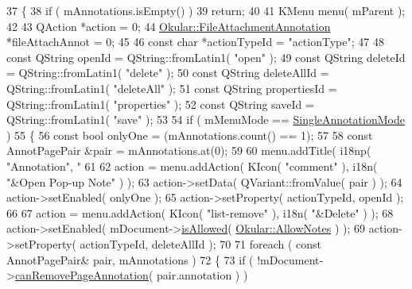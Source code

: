 \begin{DoxyCode}
37 \{
38     \textcolor{keywordflow}{if} ( mAnnotations.isEmpty() )
39         \textcolor{keywordflow}{return};
40 
41     KMenu menu( mParent );
42 
43     QAction *action = 0;
44     \hyperlink{classOkular_1_1FileAttachmentAnnotation}{Okular::FileAttachmentAnnotation} *fileAttachAnnot = 0;
45 
46     \textcolor{keyword}{const} \textcolor{keywordtype}{char} *actionTypeId = \textcolor{stringliteral}{"actionType"};
47 
48     \textcolor{keyword}{const} QString openId = QString::fromLatin1( \textcolor{stringliteral}{"open"} );
49     \textcolor{keyword}{const} QString deleteId = QString::fromLatin1( \textcolor{stringliteral}{"delete"} );
50     \textcolor{keyword}{const} QString deleteAllId = QString::fromLatin1( \textcolor{stringliteral}{"deleteAll"} );
51     \textcolor{keyword}{const} QString propertiesId = QString::fromLatin1( \textcolor{stringliteral}{"properties"} );
52     \textcolor{keyword}{const} QString saveId = QString::fromLatin1( \textcolor{stringliteral}{"save"} );
53 
54     \textcolor{keywordflow}{if} ( mMenuMode == \hyperlink{classAnnotationPopup_af8654f3f9c2a3377f86daf329f1e0679a40137692e843ce4f994737bd4a6f68f1}{SingleAnnotationMode} )
55     \{
56         \textcolor{keyword}{const} \textcolor{keywordtype}{bool} onlyOne = (mAnnotations.count() == 1);
57 
58         \textcolor{keyword}{const} AnnotPagePair &pair = mAnnotations.at(0);
59 
60         menu.addTitle( i18np( \textcolor{stringliteral}{"Annotation"}, \textcolor{stringliteral}{"%
61 
62         action = menu.addAction( KIcon( \textcolor{stringliteral}{"comment"} ), i18n( \textcolor{stringliteral}{"&Open Pop-up Note"} ) );
63         action->setData( QVariant::fromValue( pair ) );
64         action->setEnabled( onlyOne );
65         action->setProperty( actionTypeId, openId );
66 
67         action = menu.addAction( KIcon( \textcolor{stringliteral}{"list-remove"} ), i18n( \textcolor{stringliteral}{"&Delete"} ) );
68         action->setEnabled( mDocument->\hyperlink{classOkular_1_1Document_a6dd7a475b14222c07d1c410311f35cdb}{isAllowed}( \hyperlink{namespaceOkular_a3601f4e702453ddf1125476dd6e7577ba6c10962833bd58ea0f8d63e448eba8e9}{Okular::AllowNotes} ) );
69         action->setProperty( actionTypeId, deleteAllId );
70 
71         \textcolor{keywordflow}{foreach} ( \textcolor{keyword}{const} AnnotPagePair& pair, mAnnotations )
72         \{
73             \textcolor{keywordflow}{if} ( !mDocument->\hyperlink{classOkular_1_1Document_a77f5c38224da847413dbe51c5e24ed08}{canRemovePageAnnotation}( pair.annotation ) )
}
\end{DoxyCode}
